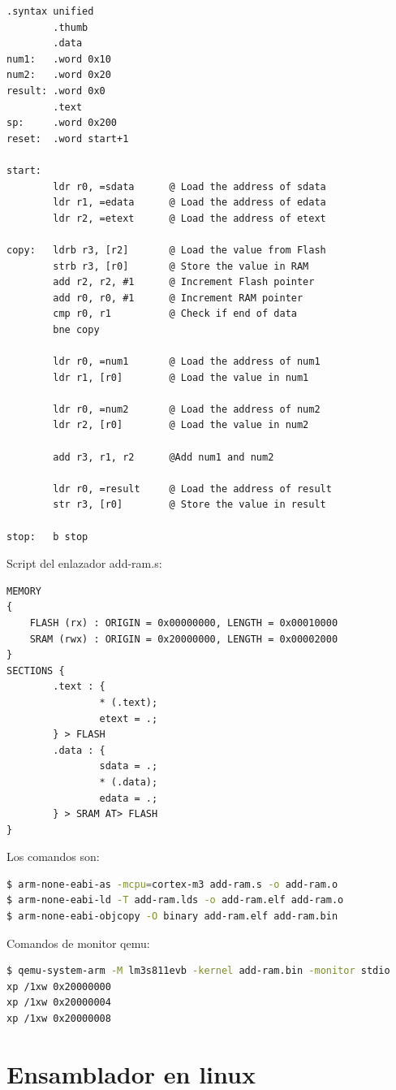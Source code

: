 \documentclass[12pt, twoside]{report}
\begin{document}
\begin{lstlisting}[language={[x86masm]Assembler}]
		.syntax unified
		.thumb
		.data
num1:	.word 0x10
num2:	.word 0x20
result: .word 0x0
		.text
sp:		.word 0x200
reset:	.word start+1

start:
		ldr r0, =sdata		@ Load the address of sdata
		ldr r1, =edata		@ Load the address of edata
		ldr r2, =etext		@ Load the address of etext

copy: 	ldrb r3, [r2]		@ Load the value from Flash
		strb r3, [r0]		@ Store the value in RAM
		add r2, r2, #1		@ Increment Flash pointer 
		add r0, r0, #1      @ Increment RAM pointer
		cmp r0, r1			@ Check if end of data
		bne	copy
		
		ldr r0, =num1		@ Load the address of num1
		ldr r1, [r0]		@ Load the value in num1
		
		ldr r0, =num2		@ Load the address of num2
		ldr r2, [r0]		@ Load the value in num2
		
		add r3, r1, r2 		@Add num1 and num2
		
		ldr r0, =result		@ Load the address of result
		str r3, [r0]		@ Store the value in result
		
stop:	b stop
\end{lstlisting}

Script del enlazador add-ram.s:

\begin{lstlisting}[language={[x86masm]Assembler}]
MEMORY
{
	FLASH (rx) : ORIGIN = 0x00000000, LENGTH = 0x00010000
	SRAM (rwx) : ORIGIN = 0x20000000, LENGTH = 0x00002000
}
SECTIONS {
		.text : {
				* (.text);
				etext = .;
		} > FLASH
		.data : {
				sdata = .;
				* (.data);
				edata = .;
		} > SRAM AT> FLASH
}
\end{lstlisting}

Los comandos son:

\begin{lstlisting}[language=bash]
$ arm-none-eabi-as -mcpu=cortex-m3 add-ram.s -o add-ram.o
$ arm-none-eabi-ld -T add-ram.lds -o add-ram.elf add-ram.o
$ arm-none-eabi-objcopy -O binary add-ram.elf add-ram.bin
\end{lstlisting}

Comandos de monitor qemu:
\begin{lstlisting}[language=bash]
$ qemu-system-arm -M lm3s811evb -kernel add-ram.bin -monitor stdio
xp /1xw 0x20000000
xp /1xw 0x20000004
xp /1xw 0x20000008
\end{lstlisting}

\chapter{Ensamblador en linux}
\end{document}
